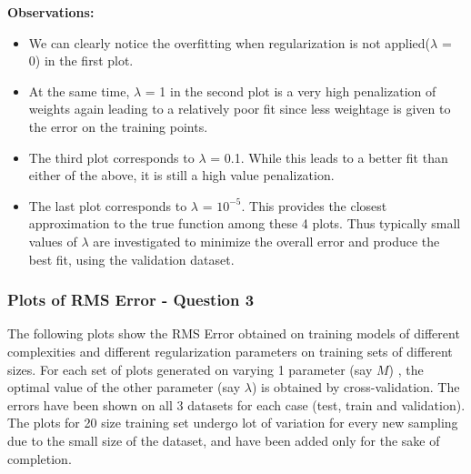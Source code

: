 \documentclass{article}
\begin{document}
\textbf{Observations: \newline}
\begin{itemize}
\item We can clearly notice the overfitting when regularization is not applied($\lambda$ = 0) in the first plot.
\item At the same time, $\lambda$ = 1 in the second plot is a very high penalization of weights again leading to a relatively poor fit since less weightage is given to the error on the training points. 
\item The third plot corresponds to $\lambda$ = 0.1. While this leads to a better fit than either of the above, it is still a high value penalization.
\item The last plot corresponds to $\lambda$ = $10^{-5}$. This provides the closest approximation to the true function among these 4 plots. Thus typically small values of $\lambda$ are investigated to minimize the overall error and produce the best fit, using the validation dataset. 
\end{itemize}
\newpage

\subsubsection{Plots of RMS Error - Question 3}
\begin{flushleft}
The following plots show the RMS Error obtained on training models of different complexities and different regularization parameters on training sets of different sizes. For each set of plots generated on varying 1 parameter (say $M$) , the optimal value of the other parameter (say $\lambda$) is obtained by cross-validation. 
The errors have been shown on all 3 datasets for each case (test, train and validation). The plots for 20 size training set undergo lot of variation for every new sampling due to the small size of the dataset, and have been added only for the sake of completion.
\end{flushleft}
\end{document}
